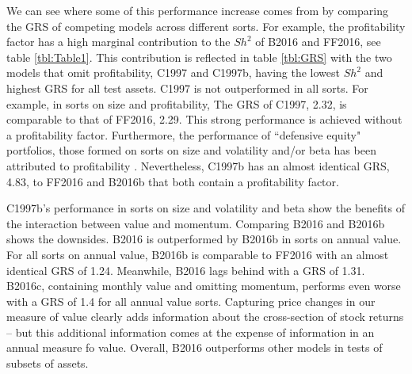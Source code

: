 We can see where some of this performance increase comes from by comparing the GRS of
competing models across different sorts. For example, the profitability factor has a high
marginal contribution to the $Sh^2$ of B2016 and FF2016, see table \ref{tbl:Table1}. This
contribution is reflected in table \ref{tbl:GRS} with the two models that omit
profitability, C1997 and C1997b, having the lowest $Sh^2$ and highest GRS for all test
assets. C1997 is not outperformed in all sorts. For example, in sorts on size and
profitability, The GRS of C1997, 2.32, is comparable to that of FF2016, 2.29. This strong
performance is achieved without a profitability factor. Furthermore, the performance of
``defensive equity" portfolios, those formed on sorts on size and volatility and/or beta
has been attributed to profitability \parencite{novy2014understanding}. Nevertheless,
C1997b has an almost identical GRS, 4.83, to FF2016 and B2016b that both contain a
profitability factor.

C1997b's performance in sorts on size and volatility and beta show the benefits of the
interaction between value and momentum. Comparing B2016 and B2016b shows the downsides.
B2016 is outperformed by B2016b in sorts on annual value. For all sorts on annual value,
B2016b is comparable to FF2016 with an almost identical GRS of 1.24. Meanwhile, B2016 lags
behind with a GRS of 1.31. B2016c, containing monthly value and omitting momentum,
performs even worse with a GRS of 1.4 for all annual value sorts. Capturing price changes
in our measure of value clearly adds information about the cross-section of stock returns
-- but this additional information comes at the expense of information in an annual
measure fo value. Overall, B2016 outperforms other models in tests of subsets of assets.
